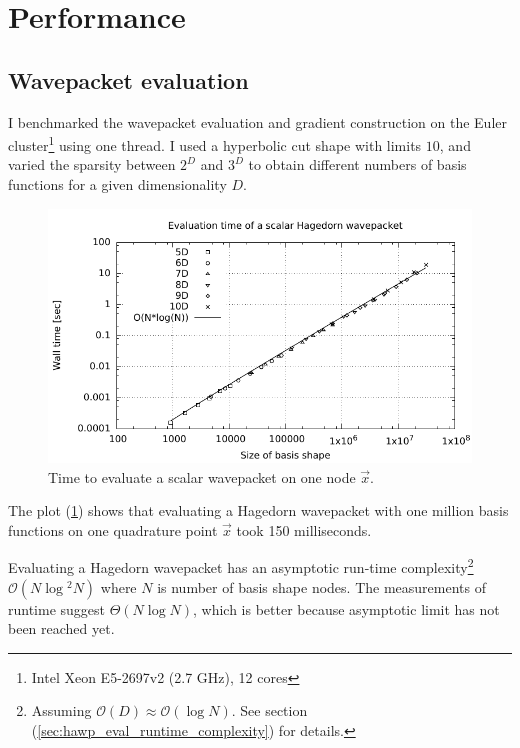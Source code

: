 \documentclass{article}
\begin{document}
\section{Performance}

\subsection{Wavepacket evaluation}

I benchmarked the wavepacket evaluation and gradient construction
on the
Euler cluster\footnote{Intel Xeon E5-2697v2 (2.7 GHz), 12 cores}
using one thread.
I used a hyperbolic cut shape with limits \(10\), and varied the
sparsity between \(2^D\) and \(3^D\) to obtain different numbers of
basis functions for a given dimensionality \(D\).

\begin{figure}[H]
  \centering
  \includegraphics[width=1.0\textwidth]{plots/hawp_eval_runtime}
  \caption{Time to evaluate a scalar wavepacket on one node \(\vec{x}\).}
  \label{fig:hawp_eval_runtime}
\end{figure}

The plot (\ref{fig:hawp_eval_runtime}) shows that
evaluating a Hagedorn wavepacket with one million basis functions
on one quadrature point \(\vec{x}\) took 150 milliseconds.

Evaluating a Hagedorn wavepacket has an asymptotic run-time
complexity\footnote{Assuming \(\mathcal{O}(D) \approx \mathcal{O}(\log{}N)\).
See section (\ref{sec:hawp_eval_runtime_complexity}) for details.}
\(\mathcal{O}(N \log{}^2N)\)
where \(N\) is number of basis shape nodes. The measurements of runtime suggest \(\Theta(N\log{}N)\),
which is better because asymptotic limit has not been reached yet.
\end{document}
